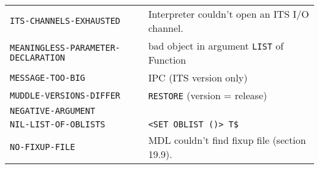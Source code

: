 \documentclass[a4paper,]{article}
\begin{document}
\begin{longtable}[]{@{}ll@{}}
\begin{minipage}[t]{0.58\columnwidth}
\texttt{ITS-CHANNELS-EXHAUSTED}\strut
\end{minipage} & \begin{minipage}[t]{0.36\columnwidth}\raggedright\strut
Interpreter couldn't open an ITS I/O channel.\strut
\end{minipage}\tabularnewline
\begin{minipage}[t]{0.58\columnwidth}\raggedright\strut
\texttt{MEANINGLESS-PARAMETER-DECLARATION}\strut
\end{minipage} & \begin{minipage}[t]{0.36\columnwidth}\raggedright\strut
bad object in argument \texttt{LIST} of Function\strut
\end{minipage}\tabularnewline
\begin{minipage}[t]{0.58\columnwidth}\raggedright\strut
\texttt{MESSAGE-TOO-BIG}\strut
\end{minipage} & \begin{minipage}[t]{0.36\columnwidth}\raggedright\strut
IPC (ITS version only)\strut
\end{minipage}\tabularnewline
\begin{minipage}[t]{0.58\columnwidth}\raggedright\strut
\texttt{MUDDLE-VERSIONS-DIFFER}\strut
\end{minipage} & \begin{minipage}[t]{0.36\columnwidth}\raggedright\strut
\texttt{RESTORE} (version = release)\strut
\end{minipage}\tabularnewline
\begin{minipage}[t]{0.58\columnwidth}\raggedright\strut
\texttt{NEGATIVE-ARGUMENT}\strut
\end{minipage} & \begin{minipage}[t]{0.36\columnwidth}\raggedright\strut
\strut
\end{minipage}\tabularnewline
\begin{minipage}[t]{0.58\columnwidth}\raggedright\strut
\texttt{NIL-LIST-OF-OBLISTS}\strut
\end{minipage} & \begin{minipage}[t]{0.36\columnwidth}\raggedright\strut
\texttt{\textless{}SET\ OBLIST\ \textquotesingle{}()\textgreater{}\ T\$}\strut
\end{minipage}\tabularnewline
\begin{minipage}[t]{0.58\columnwidth}\raggedright\strut
\texttt{NO-FIXUP-FILE}\strut
\end{minipage} & \begin{minipage}[t]{0.36\columnwidth}\raggedright\strut
MDL couldn't find fixup file (section 19.9).\strut

\end{minipage}
\end{longtable}
\end{document}
